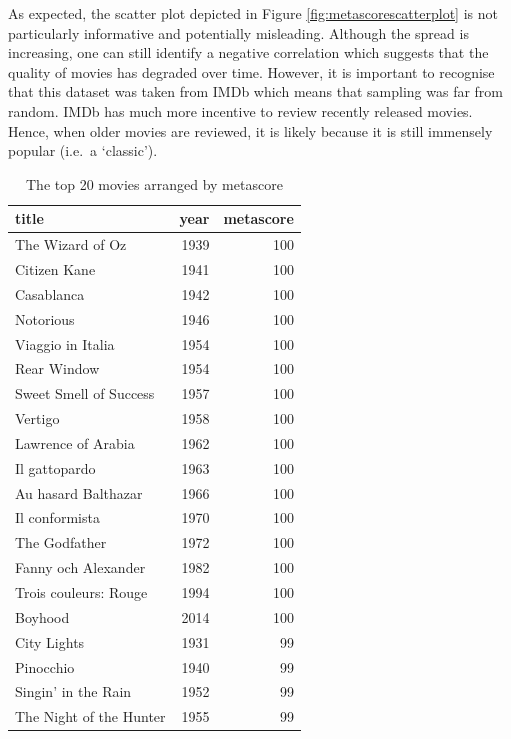 \documentclass[11pt,a4paper,]{article}
\begin{document}
As expected, the scatter plot depicted in Figure \ref{fig:metascorescatterplot} is not particularly informative and potentially misleading. Although the spread is increasing, one can still identify a negative correlation which suggests that the quality of movies has degraded over time. However, it is important to recognise that this dataset was taken from IMDb which means that sampling was far from random. IMDb has much more incentive to review recently released movies. Hence, when older movies are reviewed, it is likely because it is still immensely popular (i.e.~a `classic').

\begin{table}

\caption{\label{tab:toptwentytable}The top 20 movies arranged by metascore}
\centering
\begin{tabular}[t]{l|r|r}
\hline
title & year & metascore\\
\hline
The Wizard of Oz & 1939 & 100\\
\hline
Citizen Kane & 1941 & 100\\
\hline
Casablanca & 1942 & 100\\
\hline
Notorious & 1946 & 100\\
\hline
Viaggio in Italia & 1954 & 100\\
\hline
Rear Window & 1954 & 100\\
\hline
Sweet Smell of Success & 1957 & 100\\
\hline
Vertigo & 1958 & 100\\
\hline
Lawrence of Arabia & 1962 & 100\\
\hline
Il gattopardo & 1963 & 100\\
\hline
Au hasard Balthazar & 1966 & 100\\
\hline
Il conformista & 1970 & 100\\
\hline
The Godfather & 1972 & 100\\
\hline
Fanny och Alexander & 1982 & 100\\
\hline
Trois couleurs: Rouge & 1994 & 100\\
\hline
Boyhood & 2014 & 100\\
\hline
City Lights & 1931 & 99\\
\hline
Pinocchio & 1940 & 99\\
\hline
Singin' in the Rain & 1952 & 99\\
\hline
The Night of the Hunter & 1955 & 99\\
\hline
\end{tabular}
\end{table}
\end{document}
